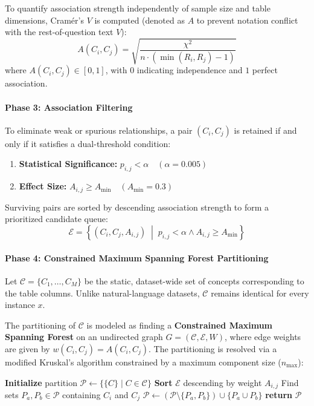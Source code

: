 To quantify association strength independently of sample size and table dimensions, Cramér's $V$ is computed (denoted as $A$ to prevent notation conflict with the rest-of-question text $V$):
\[
A(C_i, C_j) = \sqrt{\frac{\chi^2}{n \cdot (\min(R_i, R_j) - 1)}}
\]
where $A(C_i, C_j) \in [0, 1]$, with $0$ indicating independence and $1$ perfect association.

\paragraph{Phase 3: Association Filtering}
To eliminate weak or spurious relationships, a pair $(C_i, C_j)$ is retained if and only if it satisfies a dual-threshold condition:
\begin{enumerate}
    \item \textbf{Statistical Significance:} $p_{i,j} < \alpha \quad (\alpha = 0.005)$
    \item \textbf{Effect Size:} $A_{i,j} \ge A_{\min} \quad (A_{\min} = 0.3)$
\end{enumerate}
Surviving pairs are sorted by descending association strength to form a prioritized candidate queue:
\[
\mathcal{E} = \left\{ (C_i, C_j, A_{i,j}) \;\middle|\; p_{i,j} < \alpha \land A_{i,j} \ge A_{\min} \right\}
\]

\paragraph{Phase 4: Constrained Maximum Spanning Forest Partitioning}
Let $\mathcal{C} = \{C_1, \ldots, C_M\}$ be the static, dataset-wide set of concepts corresponding to the table columns. Unlike natural-language datasets, $\mathcal{C}$ remains identical for every instance $x$.

The partitioning of $\mathcal{C}$ is modeled as finding a \textbf{Constrained Maximum Spanning Forest} on an undirected graph $G = (\mathcal{C}, \mathcal{E}, W)$, where edge weights are given by $w(C_i, C_j) = A(C_i, C_j)$. The partitioning is resolved via a modified Kruskal's algorithm constrained by a maximum component size ($n_{\max}$):

\begin{algorithm}[H]
\caption{Constrained Greedy Partitioning}\label{alg:greedy_merge}
\begin{algorithmic}[1]
\State \textbf{Initialize} partition $\mathcal{P} \gets \{ \{C\} \mid C \in \mathcal{C} \}$ 
\State \textbf{Sort} $\mathcal{E}$ descending by weight $A_{i,j}$
    \State Find sets $P_a, P_b \in \mathcal{P}$ containing $C_i$ and $C_j$
        \State $\mathcal{P} \gets \left( \mathcal{P} \setminus \{P_a, P_b\} \right) \cup \{P_a \cup P_b\}$ 
    \EndIf
\EndFor
\State \textbf{return} $\mathcal{P}$
\end{algorithmic}
\end{algorithm}


